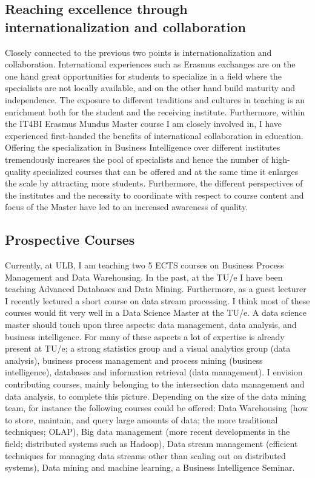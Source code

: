 \documentclass[a4paper]{article}
\begin{document}
\subsection*{Reaching excellence through internationalization and collaboration}
Closely connected to the previous two points is internationalization and collaboration. International experiences such as Erasmus exchanges are on the one hand great opportunities for students to specialize in a field where the specialists are not locally available, and on the other hand build maturity and independence. The exposure to different traditions and cultures in teaching is an enrichment both for the student and the receiving institute. Furthermore, within the IT4BI Erasmus Mundus Master course I am closely involved in, I have experienced first-handed the benefits of international collaboration in education. Offering the specialization in Business Intelligence over different institutes tremendously increases the pool of specialists and hence the number of high-quality specialized courses that can be offered and at the same time it enlarges the scale by attracting more students. Furthermore, the different perspectives of the institutes and the necessity to coordinate with respect to course content and focus of the Master have led to an increased awareness of quality.

\subsection*{Prospective Courses}
Currently, at ULB, I am teaching two 5 ECTS courses on Business Process Management and Data Warehousing. In the past, at the TU/e I have been teaching Advanced Databases and Data Mining. Furthermore, as a guest lecturer I recently lectured a short course on data stream processing. I think most of these courses would fit very well in a Data Science Master at the TU/e. A data science master should touch upon three aspects: data management, data analysis, and business intelligence. For many of these aspects a lot of expertise is already present at TU/e; a strong statistics group and a visual analytics group (data analysis), business process management and process mining (business intelligence), databases and information retrieval (data management). I envision contributing courses, mainly belonging to the intersection data management and data analysis, to complete this picture. Depending on the size of the data mining team, for instance the following courses could be offered: Data Warehousing (how to store, maintain, and query large amounts of data; the more traditional techniques; OLAP), Big data management (more recent developments in the field; distributed systems such as Hadoop), Data stream management (efficient techniques for managing data streams other than scaling out on distributed systems), Data mining and machine learning, a Business Intelligence Seminar.
\end{document}
